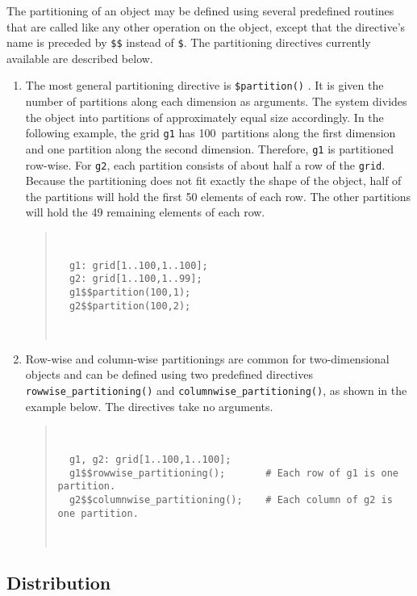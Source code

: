 \documentclass{article}
\newenvironment{example}
  {\begin{quote} ~\hrulefill }
  {~\hrulefill \end{quote} }
\begin{document}
The partitioning of an object may be defined using several predefined
routines that are called like any other operation on the object,
except that the directive's name is preceded by \verb+$$+ instead of
\verb+$+\remark{$}. The partitioning directives currently available
are described below.

\begin{enumerate}
\item
The most general partitioning directive is \verb+$partition()+
\remark{$}. It is given the number of partitions along each dimension
as arguments. The system divides the object into partitions of
approximately equal size accordingly. In the following example, the
grid \verb+g1+ has 100~partitions along the first dimension and one
partition along the second dimension. Therefore, \verb+g1+ is
partitioned row-wise. For \verb+g2+, each partition consists of about
half a row of the \verb+grid+. Because the partitioning does not fit
exactly the shape of the object, half of the partitions will hold the
first 50 elements of each row. The other partitions will hold the 49
remaining elements of each row.

\begin{example} 
\begin{verbatim}
  g1: grid[1..100,1..100];
  g2: grid[1..100,1..99];
  g1$$partition(100,1);
  g2$$partition(100,2);
\end{verbatim} 
\end{example}

\item
Row-wise and column-wise partitionings are common for two-dimensional
objects and can be defined using two predefined directives
\verb+rowwise_partitioning()+ and \verb+columnwise_partitioning()+, as
shown in the example below. The directives take no arguments.

\begin{example} 
\begin{verbatim}
  g1, g2: grid[1..100,1..100];
  g1$$rowwise_partitioning();       # Each row of g1 is one partition.
  g2$$columnwise_partitioning();    # Each column of g2 is one partition.
\end{verbatim} 
\end{example}

\end{enumerate}

\subsection{Distribution}
\end{document}
